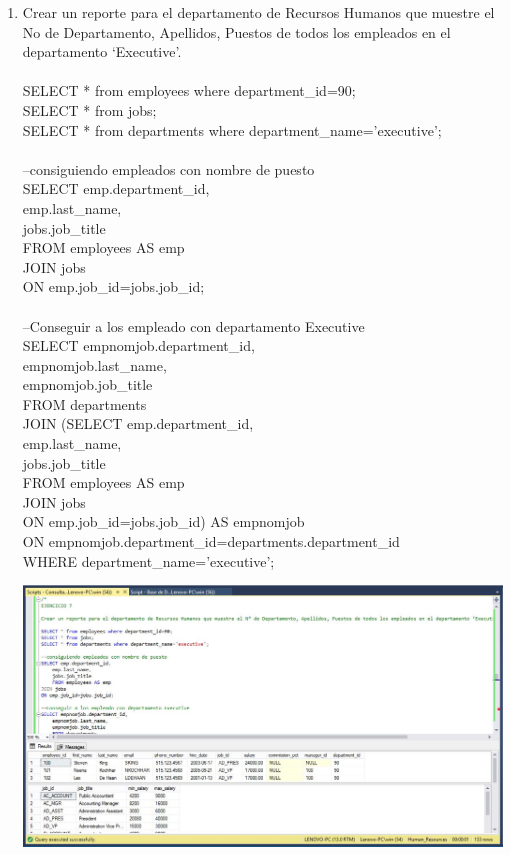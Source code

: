 \begin{enumerate}[1.]
	\item Crear un reporte para el departamento de Recursos Humanos que muestre el No de Departamento, Apellidos, Puestos de todos los empleados en el departamento ‘Executive’.
	\\
\\SELECT * from employees where department\_id=90;
\\SELECT * from jobs;
\\SELECT * from departments where department\_name='executive';
\\
\\--consiguiendo empleados con nombre de puesto
\\SELECT emp.department\_id,
\\	emp.last\_name,
\\	jobs.job\_title
\\	FROM employees AS emp
\\JOIN jobs
\\ON emp.job\_id=jobs.job\_id;
\\
\\--Conseguir a los empleado con departamento Executive
\\SELECT empnomjob.department\_id,
\\	empnomjob.last\_name,
\\	empnomjob.job\_title
\\	FROM departments
\\JOIN (SELECT emp.department\_id,
\\	emp.last\_name,
\\	jobs.job\_title
\\	FROM employees AS emp
\\JOIN jobs
\\	ON emp.job\_id=jobs.job\_id) AS empnomjob
\\	ON empnomjob.department\_id=departments.department\_id
\\WHERE department\_name='executive';\\

	\begin{center}
	\includegraphics[width=17cm]{./Imagenes/Actividad9-Ejercicio07} 
	\end{center}

\end{enumerate}
